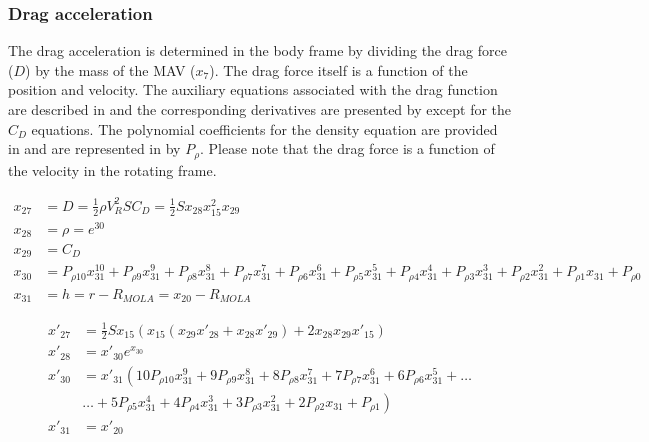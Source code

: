  \subsubsection{Drag acceleration}
 \label{subsubsec:tsiDrag}
The drag acceleration is determined in the body frame by dividing the drag force ($D$) by the mass of the \ac{MAV} ($x_{7}$). The drag force itself is a function of the position and velocity. The auxiliary equations associated with the drag function are described in  and the corresponding derivatives are presented by  except for the $C_{D}$ equations. The polynomial coefficients for the density equation are provided in  and are represented in  by $P_{\rho}$. Please note that the drag force is a function of the velocity in the rotating frame.

 \begin{equation} \label{eq:dragAux}
\begin{split}
x_{27} &= D = \frac{1}{2}\rho V_{R}^{2}SC_{D} = \frac{1}{2}S x_{28}x_{15}^{2}x_{29} \\
x_{28} &= \rho = e^{30} \\
x_{29} &= C_{D} \\
x_{30} &= P_{\rho 10}x_{31}^{10}+P_{\rho 9}x_{31}^{9}+P_{\rho 8}x_{31}^{8}+P_{\rho 7}x_{31}^{7}+P_{\rho 6}x_{31}^{6}+P_{\rho 5}x_{31}^{5}+P_{\rho 4}x_{31}^{4}+P_{\rho 3}x_{31}^{3}+P_{\rho 2}x_{31}^{2}+P_{\rho 1}x_{31}+P_{\rho 0} \\
x_{31} &= h = r-R_{MOLA} = x_{20}-R_{MOLA}
\end{split}
\end{equation}

 \begin{equation} \label{eq:dragDerAux}
\begin{split}
x'_{27} &= \frac{1}{2}Sx_{15}\left(x_{15} \left(x_{29}x'_{28}+x_{28}x'_{29}\right)+2x_{28}x_{29}x'_{15}\right) \\
x'_{28} &= x'_{30}e^{x_{30}} \\
x'_{30} &=x'_{31} \left(10 P_{\rho 10}x_{31}^{9}+9 P_{\rho 9}x_{31}^{8}+8 P_{\rho 8}x_{31}^{7}+7 P_{\rho 7}x_{31}^{6}+6 P_{\rho 6}x_{31}^{5}+\dots \right. \\
&  \left. \dotsc +5 P_{\rho 5}x_{31}^{4}+4 P_{\rho 4}x_{31}^{3}+3 P_{\rho 3}x_{31}^{2}+2 P_{\rho 2}x_{31}+P_{\rho 1}\right) \\
x'_{31} &= x'_{20}
\end{split}
\end{equation}


